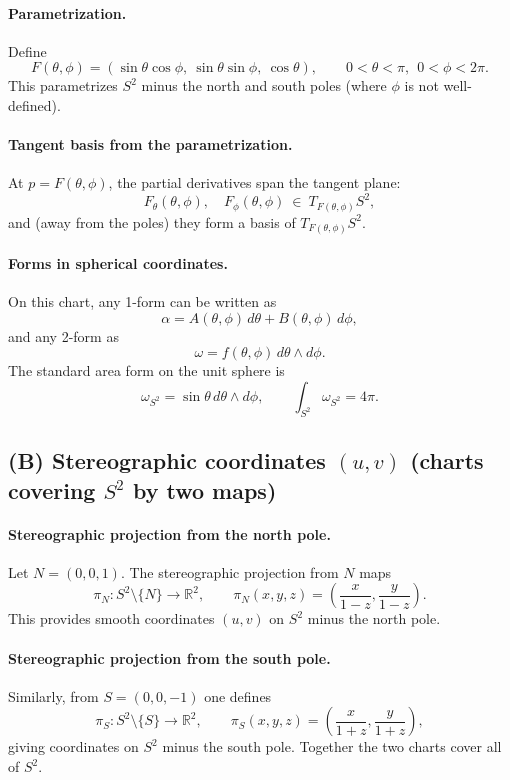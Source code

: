 \documentclass[12pt,a4paper]{article}
\theoremstyle{plain}
\theoremstyle{definition}      %
\begin{document}
\paragraph{Parametrization.}
Define
\[
F(\theta,\phi)=(\sin\theta\cos\phi,\ \sin\theta\sin\phi,\ \cos\theta),
\qquad 0<\theta<\pi,\ \ 0<\phi<2\pi.
\]
This parametrizes $S^2$ minus the north and south poles (where $\phi$ is not well-defined).

\paragraph{Tangent basis from the parametrization.}
At $p=F(\theta,\phi)$, the partial derivatives span the tangent plane:
\[
F_\theta(\theta,\phi),\quad F_\phi(\theta,\phi)\ \in\ T_{F(\theta,\phi)}S^2,
\]
and (away from the poles) they form a basis of $T_{F(\theta,\phi)}S^2$.

\paragraph{Forms in spherical coordinates.}
On this chart, any 1-form can be written as
\[
\alpha = A(\theta,\phi)\,d\theta + B(\theta,\phi)\,d\phi,
\]
and any 2-form as
\[
\omega = f(\theta,\phi)\,d\theta\wedge d\phi.
\]
The standard area form on the unit sphere is
\[
\omega_{S^2}=\sin\theta\,d\theta\wedge d\phi,
\qquad
\int_{S^2}\omega_{S^2}=4\pi.
\]

\subsection*{(B) Stereographic coordinates $(u,v)$ (charts covering $S^2$ by two maps)}

\paragraph{Stereographic projection from the north pole.}
Let $N=(0,0,1)$. The stereographic projection from $N$ maps
\[
\pi_N:S^2\setminus\{N\}\to\mathbb{R}^2,\qquad
\pi_N(x,y,z)=\left(\frac{x}{1-z},\frac{y}{1-z}\right).
\]
This provides smooth coordinates $(u,v)$ on $S^2$ minus the north pole.

\paragraph{Stereographic projection from the south pole.}
Similarly, from $S=(0,0,-1)$ one defines
\[
\pi_S:S^2\setminus\{S\}\to\mathbb{R}^2,\qquad
\pi_S(x,y,z)=\left(\frac{x}{1+z},\frac{y}{1+z}\right),
\]
giving coordinates on $S^2$ minus the south pole. Together the two charts cover all of $S^2$.
\end{document}
